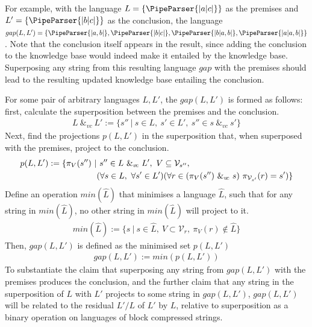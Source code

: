 \documentclass[a4paper,12pt,leqno,twoside]{article}
\newcommand{\vph}[1]{\vphantom{#1}}
\newcommand{\ebox}[1]{\fbox{$\vph{'(),}#1$}}
\newcommand{\spvc}{~\&_{v\!c}~}
\newcommand{\V}{\mathcal{V}}
\newcommand{\EventString}[1]{%
	\renewcommand*{\do}[1]{\ebox{##1}}%
	\PipeParser{#1}%
}
\begin{document}
For example, with the language $L = \{\EventString{{}|a|c|{}}\}$ as the premises and $L' = \{\EventString{{}|b|c|{}}\}$ as the conclusion, the language $gap(L, L') = \{\EventString{{}|a,b|{}}, \EventString{{}|b|c|{}}, \EventString{{}|b|a,b|{}}, \EventString{{}|a|a,b|{}}\}$. Note that the conclusion itself appears in the result, since adding the conclusion to the knowledge base would indeed make it entailed by the knowledge base. Superposing any string from this resulting language $gap$ with the premises should lead to the resulting updated knowledge base entailing the conclusion.

For some pair of arbitrary languages $L, L'$, the $gap(L,L')$ is formed as follows: first, calculate the superposition between the premises and the conclusion.
\begin{align}
	L \spvc L' := \{ s'' ~|~ s \in L,~ s' \in L',~ s'' \in s \spvc s'\}
\end{align}
Next, find the projections $p(L, L')$ in the superposition that, when superposed with the premises, project to the conclusion.
\begin{align}
	p(L, L') := \{\pi_V(s'') ~|&~ s'' \in L \spvc L',~ V \subseteq \V_{s''},\\
	&(\forall s \in L,~\forall s' \in L')(\forall r \in (\pi_V(s'') \spvc s)~ \pi_{\V_{s'}}(r) = s') \}\notag
\end{align}
Define an operation $min(\hat{L})$ that minimises a language $\hat{L}$, such that for any string in $min(\hat{L})$, no other string in $min(\hat{L})$ will project to it.
\begin{align}
	min(\hat{L}) := \{s ~|~ s \in \hat{L}, ~V \subset \V_r, ~\pi_V(r) \notin \hat{L} \}
\end{align}
Then, $gap(L, L')$ is defined as the minimised set $p(L,L')$
\begin{align}
	gap(L, L') := min(p(L, L'))\label{def:gap}
\end{align}
To substantiate the claim that superposing any string from $gap(L,L')$ with the premises produces the conclusion, and the further claim that any string in the superposition of $L$ with $L'$ projects to some string in $gap(L, L')$, $gap(L, L')$ will be related to the residual $L'/L$ of $L'$ by $L$, relative to superposition as a binary operation on languages of block compressed strings.
\end{document}
